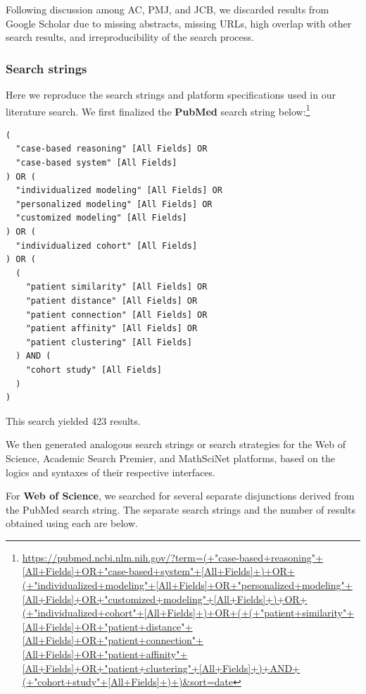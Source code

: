 \documentclass[sn-mathphys,Numbered,pdflatex]{sn-jnl}
\theoremstyle{remark}
\theoremstyle{definition}
\begin{document}
Following discussion among AC, PMJ, and JCB, we discarded results from
Google Scholar due to missing abstracts, missing URLs, high overlap with
other search results, and irreproducibility of the search process.

\subsubsection*{Search strings}\label{search-strings}

Here we reproduce the search strings and platform specifications used in
our literature search. We first finalized the \textbf{PubMed} search
string below:\footnote{\url{https://pubmed.ncbi.nlm.nih.gov/?term=(+"case-based+reasoning"+[All+Fields]+OR+"case-based+system"+[All+Fields]+)+OR+(+"individualized+modeling"+[All+Fields]+OR+"personalized+modeling"+[All+Fields]+OR+"customized+modeling"+[All+Fields]+)+OR+(+"individualized+cohort"+[All+Fields]+)+OR+(+(+"patient+similarity"+[All+Fields]+OR+"patient+distance"+[All+Fields]+OR+"patient+connection"+[All+Fields]+OR+"patient+affinity"+[All+Fields]+OR+"patient+clustering"+[All+Fields]+)+AND+(+"cohort+study"+[All+Fields]+)+)&sort=date}}

\begin{verbatim}
(
  "case-based reasoning" [All Fields] OR
  "case-based system" [All Fields]
) OR (
  "individualized modeling" [All Fields] OR
  "personalized modeling" [All Fields] OR
  "customized modeling" [All Fields]
) OR (
  "individualized cohort" [All Fields]
) OR (
  (
    "patient similarity" [All Fields] OR
    "patient distance" [All Fields] OR
    "patient connection" [All Fields] OR
    "patient affinity" [All Fields] OR
    "patient clustering" [All Fields]
  ) AND (
    "cohort study" [All Fields]
  )
)
\end{verbatim}

This search yielded 423 results.

We then generated analogous search strings or search strategies for the
Web of Science, Academic Search Premier, and MathSciNet platforms, based
on the logics and syntaxes of their respective interfaces.

For \textbf{Web of Science}, we searched for several separate
disjunctions derived from the PubMed search string. The separate search
strings and the number of results obtained using each are below.
\end{document}
